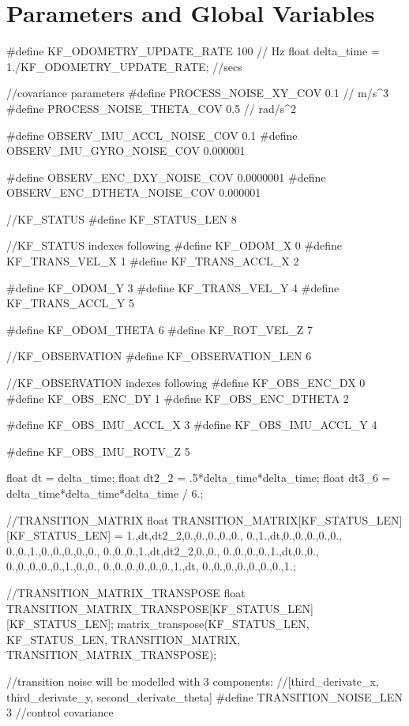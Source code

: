 \section{Parameters and Global Variables}
\begin{ccode}
	#define KF_ODOMETRY_UPDATE_RATE 100 // Hz
	float delta_time = 1./KF_ODOMETRY_UPDATE_RATE; //secs

	//covariance parameters
	#define PROCESS_NOISE_XY_COV 0.1 // m/s^3
	#define PROCESS_NOISE_THETA_COV 0.5 // rad/s^2

	#define OBSERV_IMU_ACCL_NOISE_COV 0.1
	#define OBSERV_IMU_GYRO_NOISE_COV 0.000001

	#define OBSERV_ENC_DXY_NOISE_COV 0.0000001
	#define OBSERV_ENC_DTHETA_NOISE_COV 0.000001


	//KF_STATUS
	#define KF_STATUS_LEN 8

	//KF_STATUS indexes following
	#define KF_ODOM_X 0
	#define KF_TRANS_VEL_X 1
	#define KF_TRANS_ACCL_X 2

	#define KF_ODOM_Y 3
	#define KF_TRANS_VEL_Y 4
	#define KF_TRANS_ACCL_Y 5

	#define KF_ODOM_THETA 6
	#define KF_ROT_VEL_Z 7


	//KF_OBSERVATION
	#define KF_OBSERVATION_LEN 6

	//KF_OBSERVATION indexes following
	#define KF_OBS_ENC_DX 0
	#define KF_OBS_ENC_DY 1
	#define KF_OBS_ENC_DTHETA 2

	#define KF_OBS_IMU_ACCL_X 3
	#define KF_OBS_IMU_ACCL_Y 4

	#define KF_OBS_IMU_ROTV_Z 5
	
	
	
	float dt = delta_time;
	float dt2_2 = .5*delta_time*delta_time;
	float dt3_6 = delta_time*delta_time*delta_time / 6.;
	
	//TRANSITION_MATRIX
	float TRANSITION_MATRIX[KF_STATUS_LEN][KF_STATUS_LEN] = 
		{{1.,dt,dt2_2,0.,0.,0.,0.,0.},
		{0.,1.,dt,0.,0.,0.,0.,0.},
		{0.,0.,1.,0.,0.,0.,0.,0.},
		{0.,0.,0.,1.,dt,dt2_2,0.,0.},
		{0.,0.,0.,0.,1.,dt,0.,0.},
		{0.,0.,0.,0.,0.,1.,0.,0.},
		{0.,0.,0.,0.,0.,0.,1.,dt},
		{0.,0.,0.,0.,0.,0.,0.,1.}};
	
	//TRANSITION_MATRIX_TRANSPOSE
	float TRANSITION_MATRIX_TRANSPOSE[KF_STATUS_LEN][KF_STATUS_LEN];
	matrix_transpose(KF_STATUS_LEN, KF_STATUS_LEN, TRANSITION_MATRIX, TRANSITION_MATRIX_TRANSPOSE);
	
	
	
	//transition noise will be modelled with 3 components:
		//[third_derivate_x, third_derivate_y, second_derivate_theta]
	#define TRANSITION_NOISE_LEN 3 //control covariance
	

\end{ccode}
